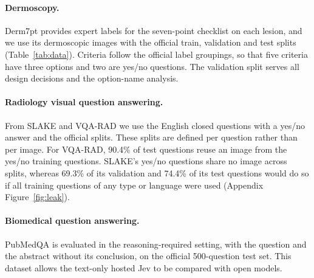 \documentclass{article}
\begin{document}
\paragraph{Dermoscopy.} Derm7pt provides expert labels for the seven-point checklist on each lesion, and we use its dermoscopic images with the official train, validation and test splits (Table~\ref{tab:data}). Criteria follow the official label groupings, so that five criteria have three options and two are yes/no questions. The validation split serves all design decisions and the option-name analysis.

\paragraph{Radiology visual question answering.} From SLAKE and VQA-RAD we use the English closed questions with a yes/no answer and the official splits. These splits are defined per question rather than per image. For VQA-RAD, 90.4\% of test questions reuse an image from the yes/no training questions. SLAKE's yes/no questions share no image across splits, whereas 69.3\% of its validation and 74.4\% of its test questions would do so if all training questions of any type or language were used (Appendix Figure~\ref{fig:leak}).

\paragraph{Biomedical question answering.} PubMedQA is evaluated in the reasoning-required setting, with the question and the abstract without its conclusion, on the official 500-question test set. This dataset allows the text-only hosted Jev to be compared with open models.
\end{document}
